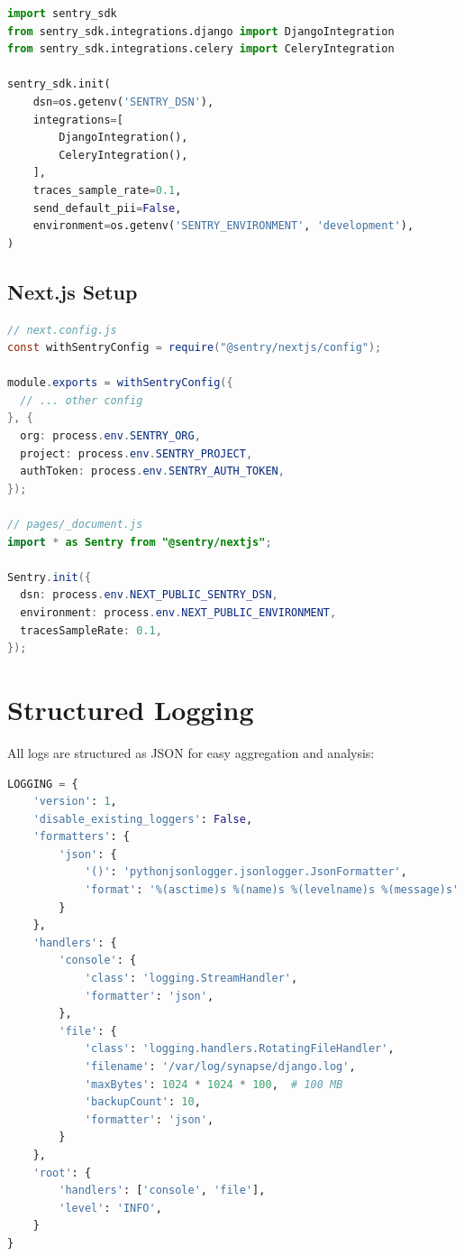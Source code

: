 \documentclass{report}
\begin{document}
\begin{lstlisting}[language=python, caption=Sentry Configuration - Django]
import sentry_sdk
from sentry_sdk.integrations.django import DjangoIntegration
from sentry_sdk.integrations.celery import CeleryIntegration

sentry_sdk.init(
    dsn=os.getenv('SENTRY_DSN'),
    integrations=[
        DjangoIntegration(),
        CeleryIntegration(),
    ],
    traces_sample_rate=0.1,
    send_default_pii=False,
    environment=os.getenv('SENTRY_ENVIRONMENT', 'development'),
)
\end{lstlisting}

\subsection{Next.js Setup}

\begin{lstlisting}[language=Java, caption=Sentry Configuration - Next.js]
// next.config.js
const withSentryConfig = require("@sentry/nextjs/config");

module.exports = withSentryConfig({
  // ... other config
}, {
  org: process.env.SENTRY_ORG,
  project: process.env.SENTRY_PROJECT,
  authToken: process.env.SENTRY_AUTH_TOKEN,
});

// pages/_document.js
import * as Sentry from "@sentry/nextjs";

Sentry.init({
  dsn: process.env.NEXT_PUBLIC_SENTRY_DSN,
  environment: process.env.NEXT_PUBLIC_ENVIRONMENT,
  tracesSampleRate: 0.1,
});
\end{lstlisting}

\section{Structured Logging}

All logs are structured as JSON for easy aggregation and analysis:

\begin{lstlisting}[language=python, caption=JSON Logging Configuration]
LOGGING = {
    'version': 1,
    'disable_existing_loggers': False,
    'formatters': {
        'json': {
            '()': 'pythonjsonlogger.jsonlogger.JsonFormatter',
            'format': '%(asctime)s %(name)s %(levelname)s %(message)s'
        }
    },
    'handlers': {
        'console': {
            'class': 'logging.StreamHandler',
            'formatter': 'json',
        },
        'file': {
            'class': 'logging.handlers.RotatingFileHandler',
            'filename': '/var/log/synapse/django.log',
            'maxBytes': 1024 * 1024 * 100,  # 100 MB
            'backupCount': 10,
            'formatter': 'json',
        }
    },
    'root': {
        'handlers': ['console', 'file'],
        'level': 'INFO',
    }
}
\end{lstlisting}
\end{document}
